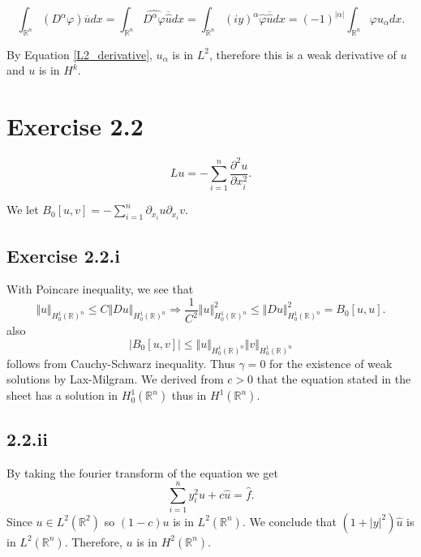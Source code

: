 \documentclass{article}
\begin{document}
\begin{equation*}
\int_{\mathbb{R}^n}(D^\alpha\varphi)\overline{u}dx=\int_{\mathbb{R}^n}\widehat{D^\alpha\varphi}\overline{\hat{u}}dx = \int_{\mathbb{R}^n}(iy)^\alpha\hat{\varphi}\overline{\hat{u}}dx =(-1)^{|\alpha|} \int_{\mathbb{R}^n}\varphi u_\alpha dx.
\end{equation*}

By Equation \ref{L2_derivative}, $u_\alpha$ is in $L^2$, therefore this is a weak derivative of $u$ and $u$ is in $H^k$.
\section*{Exercise 2.2}

\begin{equation*}
Lu = -\sum_{i=1}^n{\frac {\partial^2 u} {\partial x_i^2}}.
\end{equation*}

We let $B_0[u,v] = -\sum_{i=1}^n \partial_{x_i}u\partial_{x_i}v.$ 

\subsection{Exercise 2.2.i}

With Poincare inequality, we see that
\begin{equation*}
\Vert u\Vert _{H^1_0(\mathbb{R})^n}\leq C\Vert Du\Vert_{H^1_0(\mathbb{R})^n} \Rightarrow {\frac 1 {C^2}}\Vert u\Vert_{H^1_0(\mathbb{R})^n}^2 \leq \Vert Du\Vert_{H^1_0(\mathbb{R})^n}^2=B_0[u,u].
\end{equation*}
also
\begin{equation*}
\left|B_0[u,v]\right| \leq \Vert u\Vert_{H^1_0(\mathbb{R})^n}\Vert v\Vert_{H^1_0(\mathbb{R})^n}
\end{equation*}
follows from Cauchy-Schwarz inequality. Thus $\gamma=0$ for the existence of weak solutions by Lax-Milgram. We derived from $c>0$ that the equation stated in the sheet has a solution in $H^1_0(\mathbb{R}^n)$ thus in $H^1(\mathbb{R}^n)$.

\subsection*{2.2.ii}

By taking the fourier transform of the equation we get
\begin{equation*}
\sum_{i=1}^n y_i^2\hat{u}+c\hat{u} = \hat{f}.
\end{equation*}
Since $u\in L^2(\mathbb{R}^2)$ so $(1-c)u$ is in $L^2(\mathbb{R}^n)$. We conclude that $(1+|y|^2)\hat{u}$ is in $L^2(\mathbb{R}^n)$. Therefore, $u$ is in $H^2(\mathbb{R}^n)$. 
\end{document}
